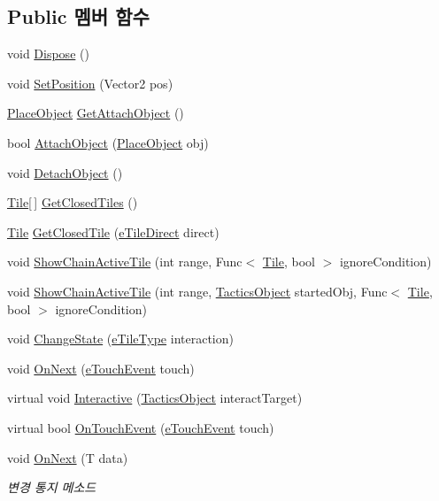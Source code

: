 \subsection*{Public 멤버 함수}
\begin{DoxyCompactItemize}
\item 
void \hyperlink{class_tile_a6e8a801e95a29156cbf32024e45c6596}{Dispose} ()
\item 
void \hyperlink{class_tile_a4d7a81b36513066aad741ed675164690}{Set\+Position} (Vector2 pos)
\item 
\hyperlink{class_place_object}{Place\+Object} \hyperlink{class_tile_a955e550fb4df0be4245223e9520c9559}{Get\+Attach\+Object} ()
\item 
bool \hyperlink{class_tile_a220ad1a57b9ba94701483822ba349891}{Attach\+Object} (\hyperlink{class_place_object}{Place\+Object} obj)
\item 
void \hyperlink{class_tile_ab8ab187ab674cfb222f761feac3b20b3}{Detach\+Object} ()
\item 
\hyperlink{class_tile}{Tile}\mbox{[}$\,$\mbox{]} \hyperlink{class_tile_a38b9f5c215f16448118e83e0d10aed05}{Get\+Closed\+Tiles} ()
\item 
\hyperlink{class_tile}{Tile} \hyperlink{class_tile_a838aaa6a94321629d04e944ed3bf8b9f}{Get\+Closed\+Tile} (\hyperlink{_tile_8cs_a082f743a62d2d8e13dac8fd38af246d7}{e\+Tile\+Direct} direct)
\item 
void \hyperlink{class_tile_a844c290ed92a538452ef9de1af64ef8e}{Show\+Chain\+Active\+Tile} (int range, Func$<$ \hyperlink{class_tile}{Tile}, bool $>$ ignore\+Condition)
\item 
void \hyperlink{class_tile_a2da9865ff4d9af18c0c00d70c08d5951}{Show\+Chain\+Active\+Tile} (int range, \hyperlink{class_tactics_object}{Tactics\+Object} started\+Obj, Func$<$ \hyperlink{class_tile}{Tile}, bool $>$ ignore\+Condition)
\item 
void \hyperlink{class_tile_a2bb5c747e9483b803ea65b4341ce5af6}{Change\+State} (\hyperlink{_tile_8cs_a271bc07be325bca511bcb747e0ff2fda}{e\+Tile\+Type} interaction)
\item 
void \hyperlink{class_tile_a6133171796d47353aa5d57cd336e0a07}{On\+Next} (\hyperlink{_touch_manager_8cs_ae33e321a424fe84ba8b2fdb81ad40a68}{e\+Touch\+Event} touch)
\item 
virtual void \hyperlink{class_tactics_object_a5f94ed01497a7072a2785163f4cbc57b}{Interactive} (\hyperlink{class_tactics_object}{Tactics\+Object} interact\+Target)
\item 
virtual bool \hyperlink{class_tactics_object_af34052e62ea471d21e4c601cc79ff717}{On\+Touch\+Event} (\hyperlink{_touch_manager_8cs_ae33e321a424fe84ba8b2fdb81ad40a68}{e\+Touch\+Event} touch)
\item 
void \hyperlink{interface_f_z_1_1_i_observer_aab88ac452adbaa1746b09a47eba97cd6}{On\+Next} (T data)
\begin{DoxyCompactList}\small\item\em 변경 통지 메소드 \end{DoxyCompactList}\end{DoxyCompactItemize}
